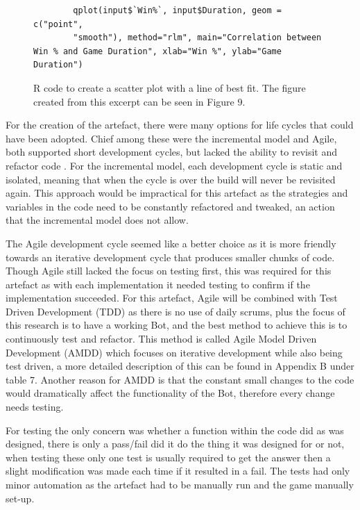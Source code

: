 \documentclass[journal]{IEEEtran}
\begin{document}
	\begin{figure}[H]
		\begin{lstlisting}
		qplot(input$`Win%`, input$Duration, geom = c("point",
		"smooth"), method="rlm", main="Correlation between Win % and Game Duration", xlab="Win %", ylab="Game Duration")
		\end{lstlisting}
		\caption{R code to create a scatter plot with a line of best fit. The figure created from this excerpt can be seen in Figure 9.}
		\label{Fig3}
	\end{figure}
	
	For the creation of the artefact, there were many options for life cycles that could have been adopted. Chief among these were the incremental model and Agile, both supported short development cycles, but lacked the ability to revisit and refactor code \cite{Life}. For the incremental model, each development cycle is static and isolated, meaning that when the cycle is over the build will never be revisited again. This approach would be impractical for this artefact as the strategies and variables in the code need to be constantly refactored and tweaked, an action that the incremental model does not allow.
	
	The Agile development cycle seemed like a better choice as it is more friendly towards an iterative development cycle that produces smaller chunks of code. Though Agile still lacked the focus on testing first, this was required for this artefact as with each implementation it needed testing to confirm if the implementation succeeded. For this artefact, Agile will be combined with Test Driven Development (TDD) as there is no use of daily scrums, plus the focus of this research is to have a working Bot, and the best method to achieve this is to continuously test and refactor. This method is called Agile Model Driven Development (AMDD) which focuses on iterative development while also being test driven, a more detailed description of this can be found in Appendix B under table 7. Another reason for AMDD is that the constant small changes to the code would dramatically affect the functionality of the Bot, therefore every change needs testing.
	
	For testing the only concern was whether a function within the code did as was designed, there is only a pass/fail did it do the thing it was designed for or not, when testing these only one test is usually required to get the answer then a slight modification was made each time if it resulted in a fail. The tests had only minor automation as the artefact had to be manually run and the game manually set-up.
	\newline
	
\end{document}
